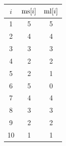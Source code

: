 \begin{tabular}{ccc}
  \hline
  $i$ & $\mathrm{ms}[i]$ & $\mathrm{ml}[i]$\\\hline
1 & 5 & 5\\
2 & 4 & 4\\
3 & 3 & 3\\
4 & 2 & 2\\
5 & 2 & 1\\
6 & 5 & 0\\
7 & 4 & 4\\
8 & 3 & 3\\
9 & 2 & 2\\
10 & 1 & 1\\
\hline
\end{tabular}
